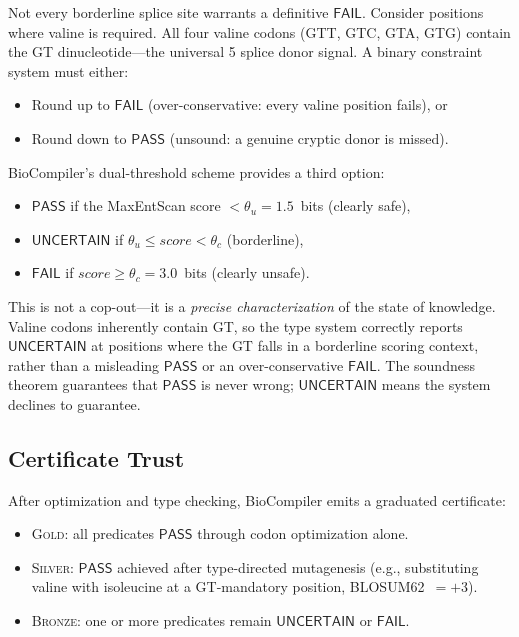 \documentclass[runningheads]{llncs}
\newcommand{\PASS}{\ensuremath{\mathsf{PASS}}\xspace}
\newcommand{\FAIL}{\ensuremath{\mathsf{FAIL}}\xspace}
\newcommand{\UNCERTAIN}{\ensuremath{\mathsf{UNCERTAIN}}\xspace}
\newcommand{\GOLD}{\textsc{Gold}\xspace}
\newcommand{\SILVER}{\textsc{Silver}\xspace}
\newcommand{\BRONZE}{\textsc{Bronze}\xspace}
\begin{document}
Not every borderline splice site warrants a definitive \FAIL.
Consider positions where valine is required.
All four valine codons (GTT, GTC, GTA, GTG) contain the GT
dinucleotide---the universal 5\textquotesingle{} splice donor signal.
A binary constraint system must either:
\begin{itemize}[leftmargin=*,itemsep=0pt,topsep=1pt]
\item Round up to \FAIL{} (over-conservative: every valine position
      fails), or
\item Round down to \PASS{} (unsound: a genuine cryptic donor is
      missed).
\end{itemize}

BioCompiler's dual-threshold scheme provides a third option:
\begin{itemize}[leftmargin=*,itemsep=0pt,topsep=1pt]
\item \PASS{} if the MaxEntScan score $< \theta_u = 1.5$~bits
      (clearly safe),
\item \UNCERTAIN{} if $\theta_u \le \mathit{score} < \theta_c$
      (borderline),
\item \FAIL{} if $\mathit{score} \ge \theta_c = 3.0$~bits
      (clearly unsafe).
\end{itemize}

This is not a cop-out---it is a \emph{precise characterization} of the
state of knowledge.
Valine codons inherently contain GT, so the type system correctly
reports \UNCERTAIN{} at positions where the GT falls in a borderline
scoring context, rather than a misleading \PASS{} or an
over-conservative \FAIL.
The soundness theorem guarantees that \PASS{} is never wrong;
\UNCERTAIN{} means the system declines to guarantee.

\subsection{Certificate Trust}

After optimization and type checking, BioCompiler emits a graduated
certificate:
\begin{itemize}[leftmargin=*,itemsep=0pt,topsep=1pt]
\item \GOLD: all predicates \PASS{} through codon optimization alone.
\item \SILVER: \PASS{} achieved after type-directed mutagenesis (e.g.,
      substituting valine with isoleucine at a GT-mandatory position,
      BLOSUM62~$= +3$).
\item \BRONZE: one or more predicates remain \UNCERTAIN{} or \FAIL{}.
\end{itemize}
\end{document}
